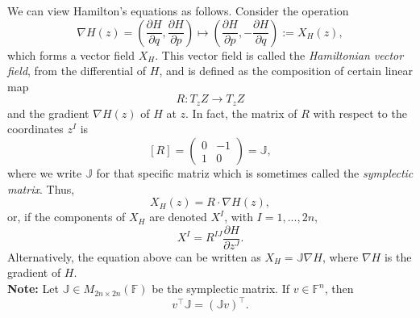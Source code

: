 We can view Hamilton's equations as follows. Consider the operation
$$
\nabla H(z)=\left(\frac{\partial H}{\partial q}, \frac{\partial H}{\partial p}\right) \mapsto \left(\frac{\partial H}{\partial p},-\frac{\partial H}{\partial q}\right):=X_H(z),
$$
which forms a vector field $X_H$. This vector field is called the \emph{Hamiltonian vector field}, from the differential of $H$, and is defined as the composition of certain linear map
$$
R:T_zZ\to T_zZ
$$
and the gradient $\nabla H(z)$ of $H$ at $z$. In fact, the matrix of $R$ with respect to the coordinates $z^I$ is
$$
[R]=\begin{pmatrix}0&-1\\1&0\end{pmatrix}=\mathbb J,
$$
where we write $\mathbb J$ for that specific matriz which is sometimes called the \emph{symplectic matrix}. Thus,
$$
X_H(z)=R\cdot \nabla H(z),
$$
or, if the components of $X_H$ are denoted $X^I$, with $I=1,...,2n$,
$$
X^I=R^{IJ} \frac{\partial H}{\partial z^J}.
$$
Alternatively, the equation above can be written as $X_H=\mathbb J\nabla H$, where $\nabla H$ is the gradient of $H$.\\

\noindent \textbf{Note:} Let $\mathbb J\in M_{2n\times 2n}(\mathbb F)$ be the symplectic matrix. If $v\in \mathbb F^n$, then
$$
v^\intercal \mathbb J=(\mathbb J v)^\intercal.
$$


